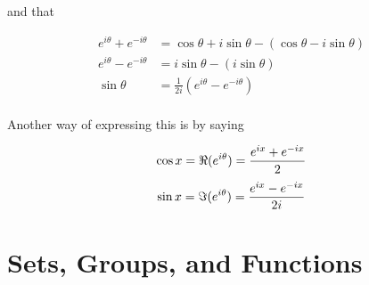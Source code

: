 \documentclass[12pt]{article}
\theoremstyle{plain}
\theoremstyle{definition}
\begin{document}
and that 

\begin{align*}
    e^{i\theta} + e^{-i\theta} &= \cos \theta + i \sin \theta - (\cos \theta - i \sin \theta) \\
    e^{i\theta} - e^{-i\theta} &= i \sin \theta - \left(i \sin \theta\right)\\
    \sin \theta &= \frac{1}{2i}\left(e^{i\theta} - e^{-i\theta}\right)\\
\end{align*}

Another way of expressing this is by saying

$$
\cos x = \real(e^{i\theta}) = \frac{e^{ix} + e^{-ix}}{2}
$$
$$
\sin x = \imaginary(e^{i\theta}) = \frac{e^{ix} - e^{-ix}}{2i}
$$

\break

\section{Sets, Groups, and Functions}
\end{document}
